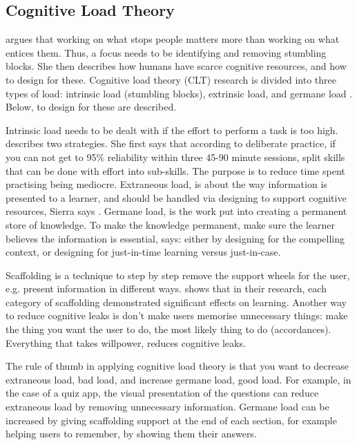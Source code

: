 \subsection{Cognitive Load Theory}

\cite{sierra} argues that working on what stops people matters more than working on what entices them. Thus, a focus needs to be identifying and removing stumbling blocks. She then describes how humans have scarce cognitive resources, and how to design for these. Cognitive load theory (CLT) research is divided into three types of load: intrinsic load (stumbling blocks), extrinsic load, and germane load \citep{sweller}. Below, to design for these are described.

Intrinsic load needs to be dealt with if the effort to perform a task is too high. \cite{sierra} describes two strategies. She first says that according to deliberate practice, if you can not get to 95\% reliability within three 45-90 minute sessions, split skills that can be done with effort into sub-skills. The purpose is to reduce time spent practising being mediocre. Extraneous load, is about the way information is presented to a learner, and should be handled via designing to support cognitive resources, Sierra says \citep{sierra}. Germane load, is the work put into creating a permanent store of knowledge. To make the knowledge permanent, make sure the learner believes the information is essential, \cite{sierra} says: either by designing for the compelling context, or designing for just-in-time learning versus just-in-case.

Scaffolding is a technique to step by step remove the support wheels for the user, e.g. present information in different ways. \cite{gates} shows that in their research, each category of scaffolding demonstrated significant effects on learning. Another way to reduce cognitive leaks is don't make users memorise unnecessary things: make the thing you want the user to do, the most likely thing to do (accordances). Everything that takes willpower, reduces cognitive leaks.

The rule of thumb in applying cognitive load theory is that you want to decrease extraneous load, bad load, and increase germane load, good load. For example, in the case of a quiz app, the visual presentation of the questions can reduce extraneous load by removing unnecessary information. Germane load can be increased by giving scaffolding support at the end of each section, for example helping users to remember, by showing them their answers.

